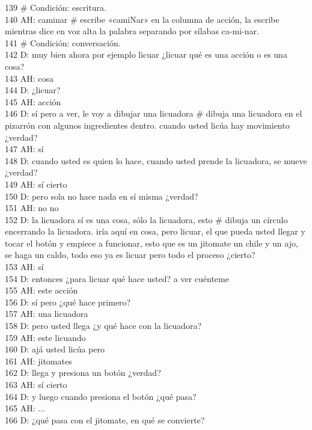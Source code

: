 139 \# Condición: escritura.\\
140 AH: caminar \# escribe «camiNar» en la columna de acción, la escribe mientras dice en voz alta la palabra separando por sílabas ca-mi-nar.\\
141 \# Condición: conversación.\\
142 D: muy bien ahora por ejemplo licuar ¿licuar qué es una acción o es una cosa?\\
143 AH: cosa\\
144 D: ¿licuar?\\
145 AH: acción\\
146 D: sí pero a ver, le voy a dibujar una licuadora \# dibuja una licuadora en el pizarrón con algunos ingredientes dentro. cuando usted licúa hay movimiento ¿verdad?\\
147 AH: sí\\
148 D: cuando usted es quien lo hace, cuando usted prende la licuadora, se mueve ¿verdad?\\
149 AH: sí cierto\\
150 D: pero sola no hace nada en sí misma ¿verdad?\\
151 AH: no no\\
152 D: la licuadora sí es una cosa, sólo la licuadora, esto \# dibuja un círculo encerrando la licuadora. iría aquí en cosa, pero licuar, el que pueda usted llegar y tocar el botón y empiece a funcionar, esto que es un jitomate un chile y un ajo, se haga un caldo, todo eso ya es licuar pero todo el proceso ¿cierto?\\
153 AH: sí\\
154 D: entonces ¿para licuar qué hace usted? a ver cuénteme\\
155 AH: este acción\\
156 D: sí pero ¿qué hace primero?\\
157 AH: una licuadora\\
158 D: pero usted llega ¿y qué hace con la licuadora?\\
159 AH: este licuando\\
160 D: ajá usted licúa pero\\
161 AH: jitomates\\
162 D: llega y presiona un botón ¿verdad?\\
163 AH: sí cierto\\
164 D: y luego cuando presiona el botón ¿qué pasa?\\
165 AH: ...\\
166 D: ¿qué pasa con el jitomate, en qué se convierte?\\
